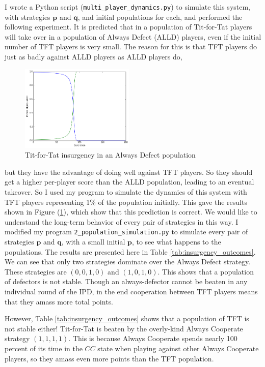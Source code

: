 \documentclass{article}
\renewcommand{\vec}[1]{\mathbf{#1}}
\begin{document}
I wrote a Python script (\texttt{multi\_player\_dynamics.py}) to simulate this system, with strategies \(\vec{p}\) and \(\vec{q}\), and initial populations for each, and performed the following experiment. It is predicted that in a population of Tit-for-Tat players will take over in a population of Always Defect (ALLD) players, even if the initial number of TFT players is very small. The reason for this is that TFT players do just as badly against ALLD players as ALLD players do,
\begin{figure}[h]
\begin{center}\includegraphics[width=0.48\textwidth]{2_player_dynamics.png}
\end{center}\caption{Tit-for-Tat insurgency in an Always Defect population} \label{fig:2_player_dynamics}
\end{figure}
but they have the advantage of doing well against TFT players. So they should get a higher per-player score than the ALLD population, leading to an eventual takeover. So I used my program to simulate the dynamics of this system with TFT players representing 1\% of the population initially. This gave the results shown in Figure (\ref{fig:2_player_dynamics}), which show that this prediction is correct. We would like to understand the long-term behavior of every pair of strategies in this way. I modified my program \texttt{2\_population\_simulation.py} to simulate every pair of strategies \(\vec{p}\) and \(\vec{q}\), with a small initial \(\vec{p}\), to see what happens to the populations. The results are presented here in Table \ref{tab:insurgency_outcomes}. We can see that only two strategies dominate over the Always Defect strategy. These strategies are \((0, 0, 1, 0)\) and \((1, 0, 1, 0)\). This shows that a population of defectors is not stable. Though an always-defector cannot be beaten in any individual round of the IPD, in the end cooperation between TFT players means that they amass more total points.



However, Table \ref{tab:insurgency_outcomes} shows that a population of TFT is not stable either! Tit-for-Tat is beaten by the overly-kind Always Cooperate strategy \((1, 1, 1, 1)\). This is because Always Cooperate spends nearly 100 percent of its time in the \(CC\) state when playing against other Always Cooperate players, so they amass even more points than the TFT population.
\end{document}
